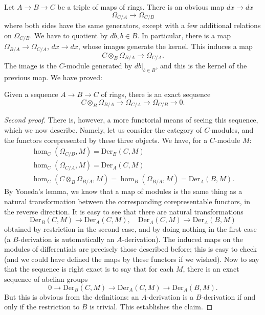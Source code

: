 Let $A \to B \to C$ be a triple of maps of rings. There is an obvious map $dx \to dx$
\[ \Omega_{C/A} \to \Omega_{C/B}  \]
where both sides have the same generators, except with a few additional
relations on $\Omega_{C/B}$. We have to quotient by $db, b \in B$. In
particular, there is a map $\Omega_{B/A} \to \Omega_{C/A}$, $dx \to dx$, whose images
generate the kernel. This induces a map
\[ C \otimes_B \Omega_{B/A} \to \Omega_{C/A}.  \]
The image is the $C$-module generated by $db|_{b \in B}$, and this is the
kernel of the previous map.
We have proved:
\begin{proposition} Given a sequence $A \to B \to C$ of rings, there is an exact sequence 
\[  C \otimes_B \Omega_{B/A} \to \Omega_{C/A} \to \Omega_{C/B} \to 0 .\]
\end{proposition} 
\begin{proof}[Second proof]
There is, however, a more functorial means of seeing this sequence, which we
now describe. 
Namely, let us consider the category of $C$-modules, and the functors
corepresented by these three objects. We have, for a $C$-module $M$:
\begin{gather*} 
\hom_C(\Omega_{C/B}, M) = \mathrm{Der}_B(C, M) \\
\hom_C(\Omega_{C/A}, M) = \mathrm{Der}_A(C, M) \\
\hom_C(C \otimes_B \Omega_{B/A}, M) = \hom_B(\Omega_{B/A}, M) = \mathrm{Der}_A(B, M).
\end{gather*} 
By Yoneda's lemma, we know that a map of modules is the same thing as a natural
transformation between the corresponding corepresentable functors, in the
reverse direction. 
It is easy to see that there are natural transformations
\[ \mathrm{Der}_B(C, M) \to \mathrm{Der}_A(C, M), \quad \mathrm{Der}_A(C, M) \to \mathrm{Der}_A(B, M)  \]
obtained by restriction in the second case, and by doing nothing in the first
case (a $B$-derivation is automatically an $A$-derivation). 
The induced maps on the modules of differentials are precisely those described
before; this is easy to check (and we could have defined the maps by these
functors if we wished). Now to say that the sequence is right exact is to say
that for each $M$, there is an exact sequence of abelian groups
\[ 0 \to \mathrm{Der}_B(C, M) \to \mathrm{Der}_A(C, M) \to \mathrm{Der}_A(B, M).  \]
But this is obvious from the definitions: an $A$-derivation is a $B$-derivation
if and only if the restriction to $B$ is trivial.
This establishes the claim. 
\end{proof} 



